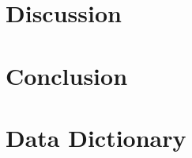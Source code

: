 \documentclass[runningheads]{llncs}
\begin{document}
\section{Discussion}


\section{Conclusion}

%
%
%
% 
% 
%
%



\appendix

\section{Data Dictionary}
\label{appendix:data_dict}

\end{document}
